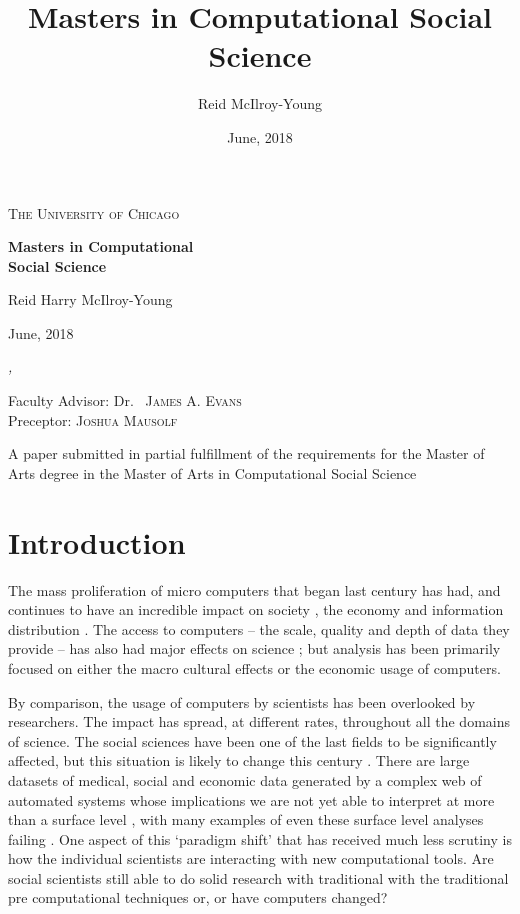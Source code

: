 \documentclass[12pt, a4paper]{article}
\author{Reid McIlroy-Young}
\title{Masters in Computational Social Science}
\date{June, 2018}
\begin{document}
\begin{titlepage}
	\centering
	{\scshape\LARGE The University of Chicago \par}
	\vspace{3cm}
	{\huge\bfseries Masters in Computational\\Social Science\par}
	\vspace{5cm}
	{Reid Harry McIlroy-Young\par}
	{June, 2018\par}
	
	\vfill
	{\itshape ,\par}
	\vspace{2cm}
	Faculty Advisor:
	Dr.~ \textsc{James A. Evans}\\
	Preceptor: \textsc{Joshua Mausolf}
	
	\vfill
	{A paper submitted in partial fulfillment of the requirements for the Master of Arts degree in the Master of Arts in Computational Social Science\par}
\end{titlepage}
\newpage
\tableofcontents
\newpage
\listoffigures
\listoftables
\newpage
\doublespacing
\setcounter{page}{1}


\section{Introduction}

The mass proliferation of micro computers that began last century has had, and continues to have an incredible impact on society \citep{weizenbaum1972impact}, the economy \citep{gordon2000does} and information distribution \citep{berners2010world}. The access to computers -- the scale, quality and depth of data they provide -- has also had major effects on science \citep{lazer2009life}; but analysis has been primarily focused on either the macro cultural effects \citep{pfaffenberger1988social} or the economic usage \citep{landauer1995trouble} of computers.

By comparison, the usage of computers by scientists has been overlooked by researchers. The impact has spread, at different rates, throughout all the domains of science. The social sciences have been one of the last fields to be significantly affected, but this situation is likely to change this century \citep{watts2007twenty}. There are large datasets of medical, social and economic data generated by a complex web of automated systems whose implications we are not yet able to interpret at more than a surface level \citep{kossinets2006empirical} \citep{back2010emotional}, with many examples of even these surface level analyses failing \citep{lazer2014parable} \citep{kramer2014experimental}. One aspect of this `paradigm shift' that has received much less scrutiny is how the individual scientists are interacting with new computational tools. Are social scientists still able to do solid research with traditional with the traditional pre computational techniques or, or have computers changed?
\end{document}
